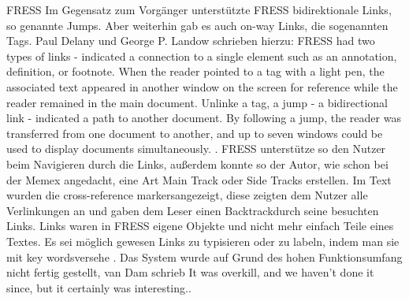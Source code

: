 \begin{section}{FRESS}
Im Gegensatz zum Vorgänger unterstützte FRESS bidirektionale Links, so genannte \glqq Jumps\grqq{ }. Aber weiterhin gab es auch on-way Links, die sogenannten \glqq Tags\grqq{ }. Paul Delany und George P. Landow schrieben hierzu: \glqq FRESS had two types of links - indicated a connection to a single element such as an annotation, definition, or footnote. When the reader pointed to a tag with a light pen, the associated text appeared in another window on the screen for reference while the reader remained in the main document. Unlinke a tag, a jump - a bidirectional link - indicated a path to another document. By following a jump, the reader was transferred from one document to another, and up to seven windows could be used to display documents simultaneously. \grqq{ }\cite[S.68]{GeorgeLandow1995}. FRESS unterstütze so den Nutzer beim Navigieren durch die Links, außerdem konnte so der Autor, wie schon bei der Memex angedacht, eine Art Main Track oder Side Tracks erstellen. Im Text wurden die \glqq cross-reference markers\grqq{ }angezeigt, diese zeigten dem Nutzer alle Verlinkungen an und gaben dem Leser einen \glqq Backtrack\grqq{ }durch seine besuchten Links. Links waren in FRESS eigene Objekte und nicht mehr einfach Teile eines Textes. Es sei möglich gewesen Links zu typisieren oder zu labeln, indem man sie mit \glqq key words\grqq{ }versehe \cite[S.891]{Dam1988}. Das System wurde auf Grund des hohen Funktionsumfang nicht fertig gestellt, van Dam schrieb \glqq It was overkill, and we haven’t done it since, but it certainly was interesting.\grqq{ }\cite[S.891]{Dam1988}.

\end{section}

